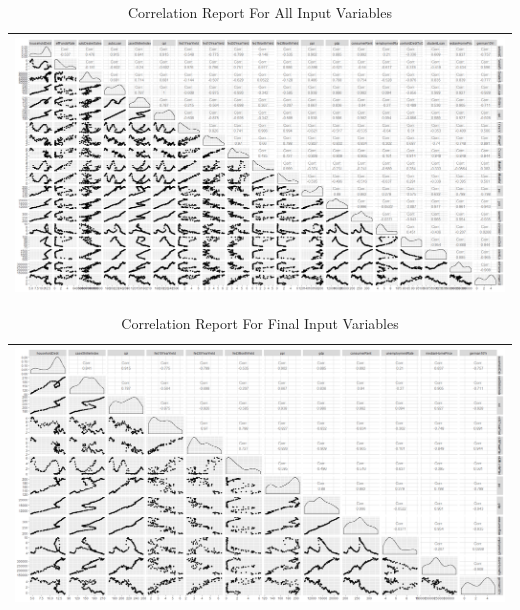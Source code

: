 \documentclass[sigconf,nonacm,11pt]{acmart}
\begin{document}
\begin{appendix}
\begin{table}[ht]
\caption{Correlation Report For All Input Variables}
\centering
\begin{tabular}{p{1.0\linewidth}}
\hline
\includegraphics[scale = 0.27]{Correlation_Plot_All.png}\\
\hline
\end{tabular}
\end{table}

\begin{table}[ht]
\caption{Correlation Report For Final Input Variables}
\centering
\begin{tabular}{p{1.0\linewidth}}
\hline
\includegraphics[scale = 0.27]{Correlation_Plot_Final.png}\\
\hline
\end{tabular}
\end{table}


\end{appendix}
\end{document}
